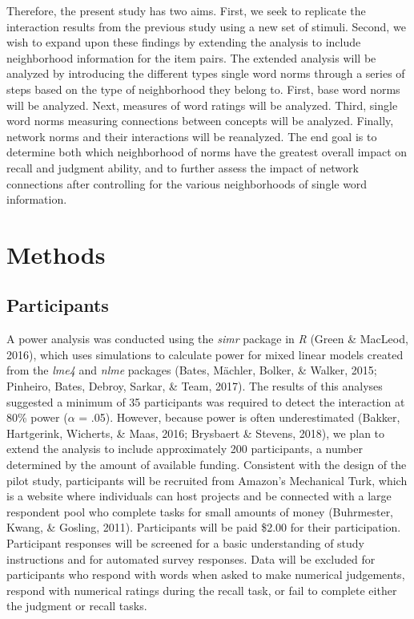 \documentclass[english,man]{apa6}
\theoremstyle{definition}
\theoremstyle{definition}
\theoremstyle{definition}
\theoremstyle{remark}
\begin{document}
Therefore, the present study has two aims. First, we seek to replicate
the interaction results from the previous study using a new set of
stimuli. Second, we wish to expand upon these findings by extending the
analysis to include neighborhood information for the item pairs. The
extended analysis will be analyzed by introducing the different types
single word norms through a series of steps based on the type of
neighborhood they belong to. First, base word norms will be analyzed.
Next, measures of word ratings will be analyzed. Third, single word
norms measuring connections between concepts will be analyzed. Finally,
network norms and their interactions will be reanalyzed. The end goal is
to determine both which neighborhood of norms have the greatest overall
impact on recall and judgment ability, and to further assess the impact
of network connections after controlling for the various neighborhoods
of single word information.

\section{Methods}\label{methods}

\subsection{Participants}\label{participants}

A power analysis was conducted using the \emph{simr} package in \emph{R}
(Green \& MacLeod, 2016), which uses simulations to calculate power for
mixed linear models created from the \emph{lme4} and \emph{nlme}
packages (Bates, Mächler, Bolker, \& Walker, 2015; Pinheiro, Bates,
Debroy, Sarkar, \& Team, 2017). The results of this analyses suggested a
minimum of 35 participants was required to detect the interaction at
80\% power (\(\alpha\) = .05). However, because power is often
underestimated (Bakker, Hartgerink, Wicherts, \& Maas, 2016; Brysbaert
\& Stevens, 2018), we plan to extend the analysis to include
approximately 200 participants, a number determined by the amount of
available funding. Consistent with the design of the pilot study,
participants will be recruited from Amazon's Mechanical Turk, which is a
website where individuals can host projects and be connected with a
large respondent pool who complete tasks for small amounts of money
(Buhrmester, Kwang, \& Gosling, 2011). Participants will be paid \$2.00
for their participation. Participant responses will be screened for a
basic understanding of study instructions and for automated survey
responses. Data will be excluded for participants who respond with words
when asked to make numerical judgements, respond with numerical ratings
during the recall task, or fail to complete either the judgment or
recall tasks.
\end{document}

